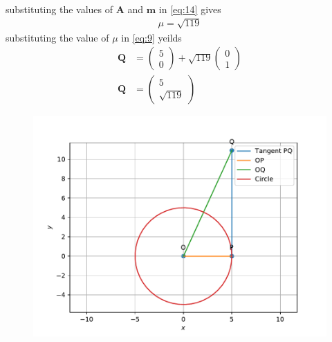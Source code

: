 \documentclass[12pt]{article}
\newcommand{\myvec}[1]{\ensuremath{\begin{pmatrix}#1\end{pmatrix}}}
\let\vec\mathbf
\begin{document}
\begin{enumerate}
\begin{align}
\end{align}
		substituting the values of $\vec{A}$ and $\vec{m}$ in \eqref{eq:14} gives
\begin{align}
\mu=\sqrt{119}
\end{align}
		substituting the value of $\mu$ in \eqref{eq:9} yeilds 
\begin{align}
	\vec{Q}&=\myvec{5\\0}+\sqrt{119}\myvec{0\\1}\\
	\vec{Q}&=\myvec{5\\\sqrt{119}}
\end{align}
\begin{figure}[!h]
\begin{center}
\includegraphics[width=\columnwidth]{figs/fig2.pdf}
\end{center}
\caption{}
\label{fig:Fig1}
\end{figure}
\end{enumerate}
\end{document}
